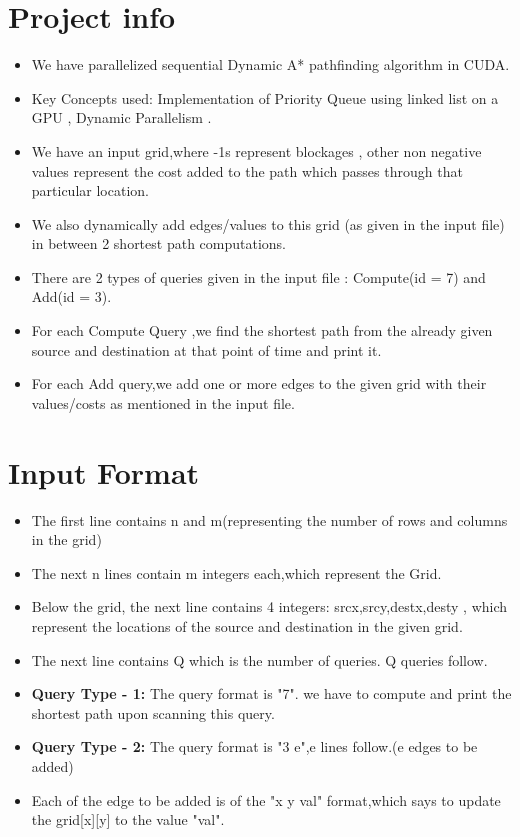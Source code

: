 \documentclass[12pt]{article}
\begin{document}
\section{Project info}
\begin{itemize}
    \item We have parallelized sequential Dynamic A* pathfinding algorithm in CUDA.
    \item Key Concepts used: Implementation of Priority Queue using linked list on a GPU , Dynamic Parallelism .
    \item We have an input grid,where -1s represent blockages , other non negative values represent the cost added to the path which passes through that particular location.
    \item We also dynamically add edges/values to this grid (as given in the input file) in between 2 shortest path computations.
    \item There are 2 types of queries given in the input file : Compute(id = 7) and Add(id = 3).
    \item For each Compute Query ,we find the shortest path from the already given source and destination at that point of time and print it.
    \item For each Add query,we add one or more edges to the given grid with their values/costs as mentioned in the input file.
\end{itemize}

\section{Input Format}
\begin{itemize}
    \item The first line contains n and m(representing the number of rows and columns in the grid)
    \item The next n lines contain m integers each,which represent the Grid.
    \item Below the grid, the next line contains 4 integers: srcx,srcy,destx,desty , which represent the locations of the source and destination in the given grid.
    \item The next line contains Q which is the number of queries. Q queries follow.
    \item \textbf{Query Type - 1:} The query format is "7". we have to compute and print the shortest path upon scanning this query.
    \item \textbf{Query Type - 2:} The query format is "3 e",e lines follow.(e edges to be added)
    \item Each of the edge to be added is of the "x y val" format,which says to update the grid[x][y] to the value "val".
\end{itemize}
\end{document}
